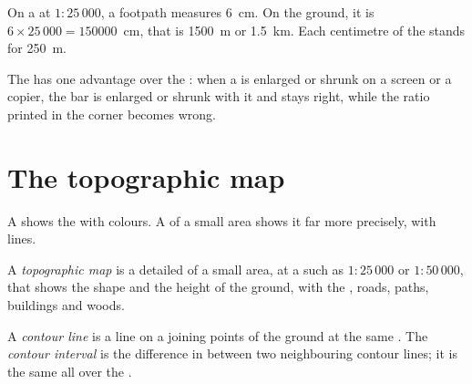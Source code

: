 \begin{example}
On a  at $1 : 25\,000$, a footpath measures \qty{6}{cm}. On the ground,
it is $6 \times 25\,000 = \num{150000}$~cm, that is \qty{1500}{m} or
\qty{1.5}{km}. Each centimetre of the  stands for \qty{250}{m}.
\end{example}

The  has one advantage over the : when a  is
enlarged or shrunk on a screen or a copier, the bar is enlarged or shrunk
with it and stays right, while the ratio printed in the corner becomes
wrong.

\section{The topographic map}

A  shows the  with colours. A  of a small area shows
it far more precisely, with lines.

\begin{definition}\label{def:g9:maps-of-the-earth:topographic-map}
A \emph{topographic map} is a detailed  of a
small area, at a  such as $1 : 25\,000$ or $1 : 50\,000$, that shows
the shape and the height of the ground, with the , roads, paths,
buildings and woods.
\end{definition}

\begin{definition}\label{def:g9:maps-of-the-earth:contour}
A \emph{contour line} is a line on a  joining
points of the ground at the same . The \emph{contour
interval} is the difference in  between
two neighbouring contour lines; it is the same all over the .
\end{definition}

